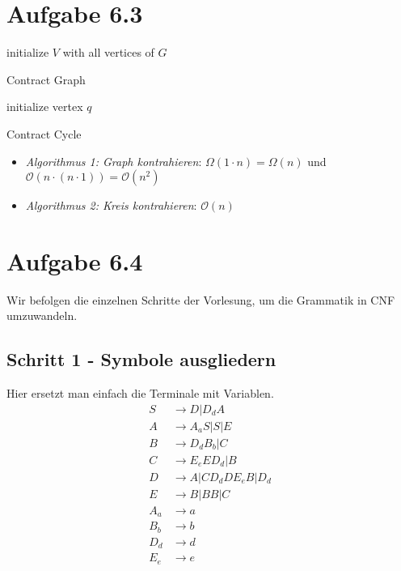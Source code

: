 \documentclass{article}
\begin{document}
\section*{Aufgabe 6.3}
\begin{algorithm}[H]
  initialize $V$ with all vertices of $G$\;
  \caption{Contract Graph}
\end{algorithm}

\begin{algorithm}[H]
  initialize vertex $q$\;
  \caption{Contract Cycle}
\end{algorithm}

\begin{itemize}
	\item \textit{Algorithmus 1: Graph kontrahieren}: $\Omega(1 \cdot n) = \Omega(n)$ und $\mathcal{O}(n \cdot (n \cdot 1)) = \mathcal{O}(n^2)$
  \item \textit{Algorithmus 2: Kreis kontrahieren}: $\mathcal{O}(n)$
\end{itemize}



\section*{Aufgabe 6.4}
Wir befolgen die einzelnen Schritte der Vorlesung, um die Grammatik in CNF umzuwandeln.
\subsection*{Schritt 1 - Symbole ausgliedern}
Hier ersetzt man einfach die Terminale mit Variablen.
\begin{align*}
S&\rightarrow D | D_dA\\
A&\rightarrow A_aS | S | E\\
B&\rightarrow D_dB_b | C\\
C&\rightarrow E_eED_d | B\\
D&\rightarrow A | CD_dDE_eB | D_d\\
E&\rightarrow B | BB | C\\
A_a&\rightarrow a\\
B_b&\rightarrow b\\
D_d&\rightarrow d\\
E_e&\rightarrow e
\end{align*}
\end{document}
